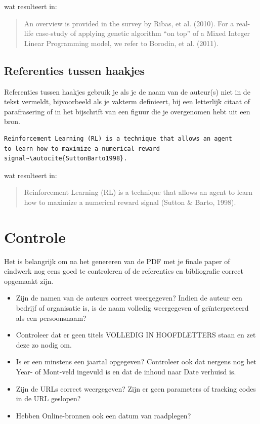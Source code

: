 wat resulteert in:

\begin{quotation}
  An overview is provided in the survey by Ribas, et al. (2010). For a real-life case-study of applying genetic algorithm ``on top'' of a Mixed Integer Linear Programming model, we refer to Borodin, et al. (2011).
\end{quotation}

\subsection{Referenties tussen haakjes}%
\label{ssec:referenties_tussen_haakjes}

Referenties tussen haakjes gebruik je als je de naam van de auteur(s) niet in de tekst vermeldt, bijvoorbeeld als je vakterm definieert, bij een letterlijk citaat of parafrasering of in het bijschrift van een figuur die je overgenomen hebt uit een bron.

\begin{verbatim}
Reinforcement Learning (RL) is a technique that allows an agent
to learn how to maximize a numerical reward
signal~\autocite{SuttonBarto1998}.
\end{verbatim}

wat resulteert in:

\begin{quotation}
  Reinforcement Learning (RL) is a technique that allows an agent to learn how to maximize a numerical reward signal (Sutton \& Barto, 1998).
\end{quotation}

\section{Controle}%
\label{sec:bibliografie-controle}

Het is belangrijk om na het genereren van de PDF met je finale paper of eindwerk nog eens goed te controleren of de referenties en bibliografie correct opgemaakt zijn.

\begin{itemize}
  \item Zijn de namen van de auteurs correct weergegeven? Indien de auteur een bedrijf of organisatie is, is de naam volledig weergegeven of geïnterpreteerd als een persoonsnaam?
  \item Controleer dat er geen titels VOLLEDIG IN HOOFDLETTERS staan en zet deze zo nodig om.
  \item Is er een minstens een jaartal opgegeven? Controleer ook dat nergens nog het Year- of Mont-veld ingevuld is en dat de inhoud naar Date verhuisd is.
  \item Zijn de URLs correct weergegeven? Zijn er geen parameters of tracking codes in de URL geslopen?
  \item Hebben Online-bronnen ook een datum van raadplegen?
  \end{itemize}

